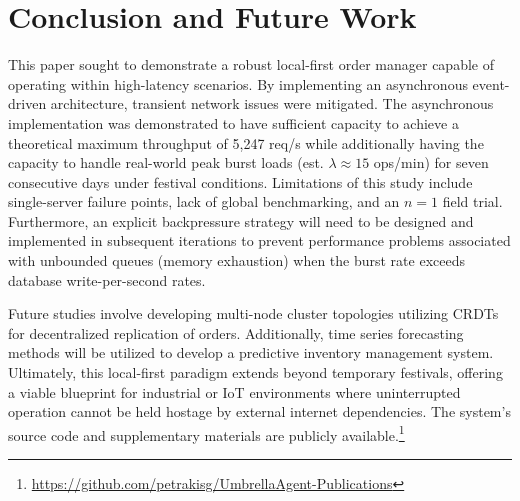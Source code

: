 \documentclass[conference]{IEEEtran}
\begin{document}
\section{Conclusion and Future Work}

This paper sought to demonstrate a robust local-first order manager capable of operating within high-latency scenarios. By implementing an asynchronous event-driven architecture, transient network issues were mitigated. The asynchronous implementation was demonstrated to have sufficient capacity to achieve a theoretical maximum throughput of 5,247 req/s while additionally having the capacity to handle real-world peak burst loads (est. $\lambda \approx 15$ ops/min) for seven consecutive days under festival conditions. Limitations of this study include single-server failure points, lack of global benchmarking, and an $n=1$ field trial. Furthermore, an explicit backpressure strategy will need to be designed and implemented in subsequent iterations to prevent performance problems associated with unbounded queues (memory exhaustion) when the burst rate exceeds database write-per-second rates.

Future studies involve developing multi-node cluster topologies utilizing CRDTs \cite{shapiro2011crdt} for decentralized replication of orders. Additionally, time series forecasting methods \cite{merilainen2026time} will be utilized to develop a predictive inventory management system. Ultimately, this local-first paradigm extends beyond temporary festivals, offering a viable blueprint for industrial or IoT environments where uninterrupted operation cannot be held hostage by external internet dependencies. The system's source code and supplementary materials are publicly available.\footnote{\url{https://github.com/petrakisg/UmbrellaAgent-Publications}}
\end{document}
